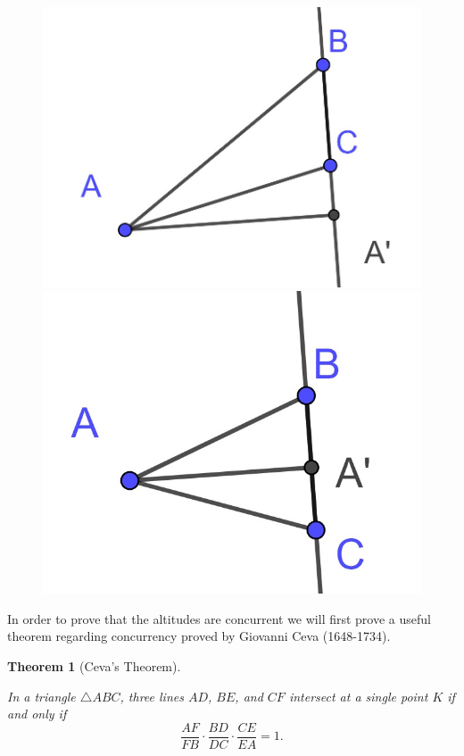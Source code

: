 \documentclass[
]{book}
\newtheorem{theorem}{Theorem}[chapter]
\theoremstyle{definition}
\theoremstyle{definition}
\theoremstyle{definition}
\theoremstyle{definition}
\theoremstyle{remark}
\begin{document}
\begin{figure}

{\centering \includegraphics[width=0.2\linewidth]{images/orthocenter1} \includegraphics[width=0.2\linewidth]{images/orthocenter2} 

}

\end{figure}

In order to prove that the altitudes are concurrent we will first prove a useful theorem regarding concurrency proved by Giovanni Ceva (1648-1734).

\begin{theorem}[Ceva's Theorem]
\protect\hypertarget{thm:unlabeled-div-193}{}\label{thm:unlabeled-div-193}

In a triangle \(\triangle ABC\), three lines \(AD\), \(BE\), and \(CF\) intersect at a single point \(K\) if and only if
\[\frac{AF}{FB} \cdot \frac{BD}{DC} \cdot \frac{CE}{EA} = 1.\]

\end{theorem}
\end{document}
